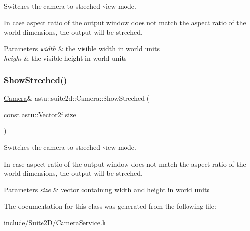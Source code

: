 Switches the camera to streched view mode.

In case aspect ratio of the output window does not match the aspect ratio of the world dimensions, the output will be streched.


\begin{DoxyParams}{Parameters}
{\em width} & the visible width in world units \\
\hline
{\em height} & the visible height in world units \\
\hline
\end{DoxyParams}
\mbox{\label{classastu_1_1suite2d_1_1Camera_af92dc2a15adcba875cdac653b44b546e}} 
\subsubsection{\texorpdfstring{Show\+Streched()}{ShowStreched()}\hspace{0.1cm}{\footnotesize\ttfamily [2/2]}}
{\footnotesize\ttfamily \hyperlink{classastu_1_1suite2d_1_1Camera}{Camera}\& astu\+::suite2d\+::\+Camera\+::\+Show\+Streched (\begin{DoxyParamCaption}\item[{const \hyperlink{classastu_1_1Vector2}{astu\+::\+Vector2f}}]{size }\end{DoxyParamCaption})\hspace{0.3cm}{\ttfamily [inline]}}

Switches the camera to streched view mode.

In case aspect ratio of the output window does not match the aspect ratio of the world dimensions, the output will be streched.


\begin{DoxyParams}{Parameters}
{\em size} & vector containing width and height in world units \\
\hline
\end{DoxyParams}


The documentation for this class was generated from the following file\+:\begin{DoxyCompactItemize}
\item 
include/\+Suite2\+D/Camera\+Service.\+h\end{DoxyCompactItemize}
